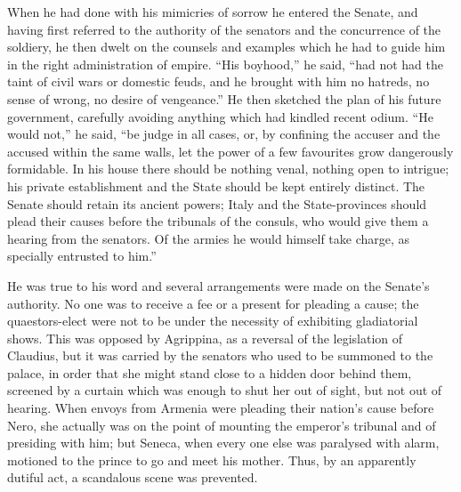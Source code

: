 
When he had done with his mimicries of sorrow he entered the Senate, and having first referred to the authority of the senators and the concurrence of the soldiery, he then dwelt on the counsels and examples which he had to guide him in the right administration of empire. ``His boyhood,'' he said, ``had not had the taint of civil wars or domestic feuds, and he brought with him no hatreds, no sense of wrong, no desire of vengeance.'' He then sketched the plan of his future government, carefully avoiding anything which had kindled recent odium. ``He would not,'' he said, ``be judge in all cases, or, by confining the accuser and the accused within the same walls, let the power of a few favourites grow dangerously formidable. In his house there should be nothing venal, nothing open to intrigue; his private establishment and the State should be kept entirely distinct. The Senate should retain its ancient powers; Italy and the State-provinces should plead their causes before the tribunals of the consuls, who would give them a hearing from the senators. Of the armies he would himself take charge, as specially entrusted to him.''


He was true to his word and several arrangements were made on the Senate's authority. No one was to receive a fee or a present for pleading a cause; the quaestors-elect were not to be under the necessity of exhibiting gladiatorial shows. This was opposed by Agrippina, as a reversal of the legislation of Claudius, but it was carried by the senators who used to be summoned to the palace, in order that she might stand close to a hidden door behind them, screened by a curtain which was enough to shut her out of sight, but not out of hearing. When envoys from Armenia were pleading their nation's cause before Nero, she actually was on the point of mounting the emperor's tribunal and of presiding with him; but Seneca, when every one else was paralysed with alarm, motioned to the prince to go and meet his mother. Thus, by an apparently dutiful act, a scandalous scene was prevented.


